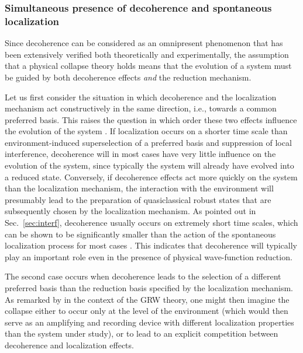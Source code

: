\documentclass[rmp,aps,amsmath,amsfonts,noshowkeys,noshowpacs,12pt]{revtex4}
\begin{document}
\subsubsection{Simultaneous presence of decoherence and spontaneous
  localization}  

Since decoherence can be considered as an omnipresent phenomenon that
has been extensively verified both theoretically and experimentally,
the assumption that a physical collapse theory holds means that the
evolution of a system must be guided by both decoherence effects
\emph{and} the reduction mechanism.

Let us first consider the situation in which decoherence and the
localization mechanism act constructively in the same direction, i.e.,
towards a common preferred basis. This raises the question in which
order these two effects influence the evolution of the system
\citep{Bacciagaluppi:2003:yz}. If localization occurs on a shorter
time scale than environment-induced superselection of a preferred
basis and suppression of local interference, decoherence will in most
cases have very little influence on the evolution of the system, since
typically the system will already have evolved into a reduced state.
Conversely, if decoherence effects act more quickly on the system than
the localization mechanism, the interaction with the environment will
presumably lead to the preparation of quasiclassical robust states
that are subsequently chosen by the localization mechanism. As pointed
out in Sec.~\ref{sec:interf}, decoherence usually occurs on extremely
short time scales, which can be shown to be significantly smaller than
the action of the spontaneous localization process for most cases
\citetext{for studies related to the GRW model, see
  \citealp{Tegmark:1993:uz} and \citealp{Benatti:1995:re}}. This
indicates that decoherence will typically play an important role even
in the presence of physical wave-function reduction.

The second case occurs when decoherence leads to the selection of a
different preferred basis than the reduction basis specified by the
localization mechanism. As remarked by
\citet{Bacciagaluppi:2003:yz,Bacciagaluppi:2003:az} in the context of
the GRW theory, one might then imagine the collapse either to occur
only at the level of the environment (which would then serve as an
amplifying and recording device with different localization properties
than the system under study), or to lead to an explicit competition
between decoherence and localization effects.
\end{document}
